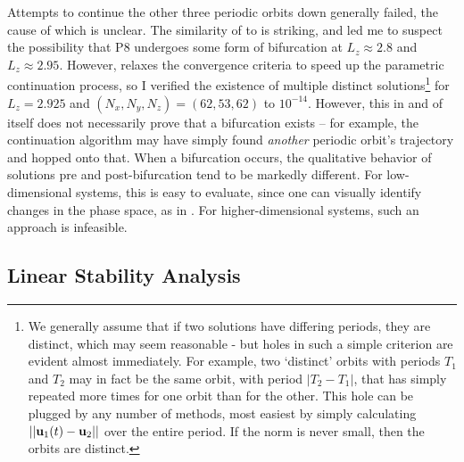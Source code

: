  Attempts to continue the other three periodic orbits down generally failed, the cause of which is unclear. The similarity of  to  is striking, and led me to suspect the possibility that P8 undergoes some form of bifurcation at $L_z \approx 2.8$ and $L_z \approx 2.95$. However,  relaxes the convergence criteria to speed up the parametric continuation process, so I verified the existence of multiple distinct solutions\footnote{We generally assume that if two solutions have differing periods, they are distinct, which may seem reasonable - but holes in such a simple criterion are evident almost immediately. For example, two `distinct' orbits with periods $T_1$ and $T_2$ may in fact be the same orbit, with period $|T_2-T_1|$, that has simply repeated more times for one orbit than for the other. This hole can be plugged by any number of methods, most easiest by simply calculating $||\mathbf{u}_1(t) - \mathbf{u}_2||$ over the entire period. If the norm is never small, then the orbits are distinct. } for $L_z = 2.925$ and $(N_x,N_y,N_z) = (62,53,62)$ to $10^{-14}$. However, this in and of itself does not necessarily prove that a bifurcation exists -- for example, the continuation algorithm may have simply found \emph{another} periodic orbit's trajectory and hopped onto that. When a bifurcation occurs, the qualitative behavior of solutions pre and post-bifurcation tend to be markedly different. For low-dimensional systems, this is easy to evaluate, since one can visually identify changes in the phase space, as in . For higher-dimensional systems, such an approach is infeasible. 

\subsection{Linear Stability Analysis}\label{sec:LSA}

